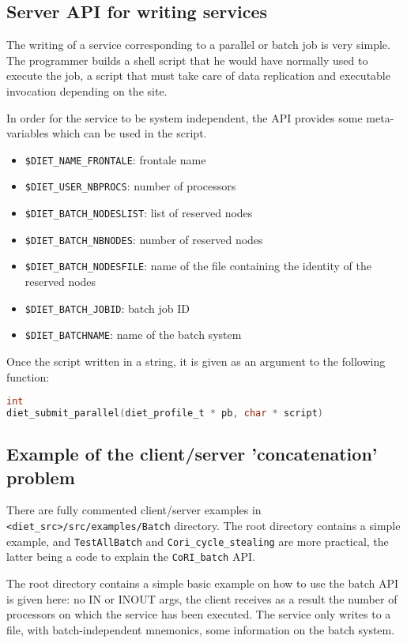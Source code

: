 \subsection{Server API for writing services}

The writing of a service corresponding to a parallel or batch job is
very simple. The \sed programmer builds a shell script that he would
have normally used to execute the job, \ie a script that must take
care of data replication and executable invocation depending on the
site.

In order for the service to be system independent, the \sed API
provides some meta-variables which can be used in the script. 

\begin{itemize}
\item \verb!$DIET_NAME_FRONTALE!: frontale name
\item \verb!$DIET_USER_NBPROCS!: number of processors
\item \verb!$DIET_BATCH_NODESLIST!: list of reserved nodes
\item \verb!$DIET_BATCH_NBNODES!: number of reserved nodes
\item \verb!$DIET_BATCH_NODESFILE!: name of the file containing the
identity of the reserved nodes
\item \verb!$DIET_BATCH_JOBID!: batch job ID
\item \verb!$DIET_BATCHNAME!: name of the batch system
\end{itemize}


Once the script written in a string, it is given as an argument to the
following function:
\begin{lstlisting}[language=C,basewidth={.5em,.4em},fontadjust]
int 
diet_submit_parallel(diet_profile_t * pb, char * script)
\end{lstlisting}
\subsection{Example of the client/server 'concatenation' problem}

There are fully commented client/server examples in
\verb!<diet_src>/src/examples/Batch! directory. The root directory
contains a simple example, and \verb!TestAllBatch! and
\verb!Cori_cycle_stealing! are more practical, the latter being a code to
explain the \verb!CoRI_batch! API.

The root directory contains a simple basic example on how to use the batch API
is given here: no IN or INOUT args, the client receives as a result the number
of processors on which the service has been executed. The service only writes
to a file, with batch-independent mnemonics, some information on the batch
system.

